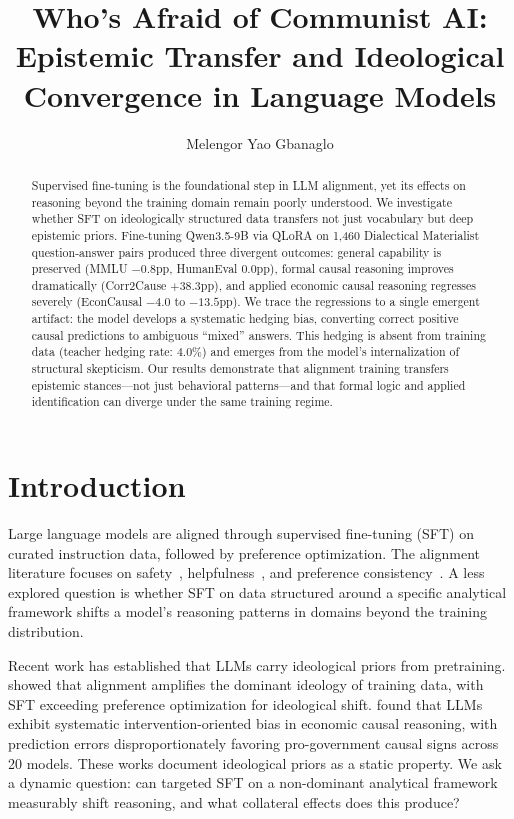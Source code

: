 \documentclass{article}
\title{Who's Afraid of Communist AI: \\ Epistemic Transfer and Ideological Convergence in Language Models}
\author{Melengor Yao Gbanaglo}
\begin{document}
\maketitle

\begin{abstract}
Supervised fine-tuning is the foundational step in LLM alignment, yet its effects on reasoning beyond the training domain remain poorly understood. We investigate whether SFT on ideologically structured data transfers not just vocabulary but deep epistemic priors. Fine-tuning Qwen3.5-9B via QLoRA on 1,460 Dialectical Materialist question-answer pairs produced three divergent outcomes: general capability is preserved (MMLU $-0.8$pp, HumanEval $0.0$pp), formal causal reasoning improves dramatically (Corr2Cause $+38.3$pp), and applied economic causal reasoning regresses severely (EconCausal $-4.0$ to $-13.5$pp). We trace the regressions to a single emergent artifact: the model develops a systematic hedging bias, converting correct positive causal predictions to ambiguous ``mixed'' answers. This hedging is absent from training data (teacher hedging rate: $4.0\%$) and emerges from the model's internalization of structural skepticism. Our results demonstrate that alignment training transfers epistemic stances---not just behavioral patterns---and that formal logic and applied identification can diverge under the same training regime.
\end{abstract}

\section{Introduction}

Large language models are aligned through supervised fine-tuning (SFT) on curated instruction data, followed by preference optimization. The alignment literature focuses on safety~\citep{bai2022constitutional}, helpfulness~\citep{ouyang2022training}, and preference consistency~\citep{rafailov2023direct}. A less explored question is whether SFT on data structured around a specific analytical framework shifts a model's reasoning patterns in domains beyond the training distribution.

Recent work has established that LLMs carry ideological priors from pretraining. \citet{kronlund2024propaganda} showed that alignment amplifies the dominant ideology of training data, with SFT exceeding preference optimization for ideological shift. \citet{lee2026ideological} found that LLMs exhibit systematic intervention-oriented bias in economic causal reasoning, with prediction errors disproportionately favoring pro-government causal signs across 20 models. These works document ideological priors as a static property. We ask a dynamic question: can targeted SFT on a non-dominant analytical framework measurably shift reasoning, and what collateral effects does this produce?
\end{document}
